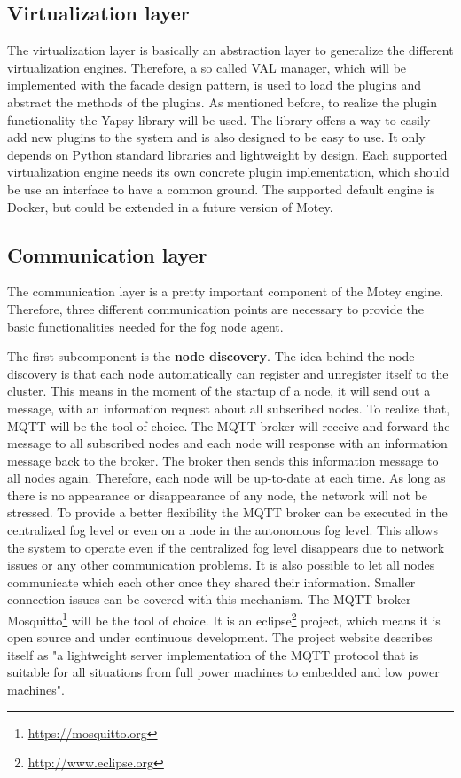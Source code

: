 \subsection{Virtualization layer}
The virtualization layer is basically an abstraction layer to generalize the different virtualization engines.
Therefore, a so called \ac{VAL} manager, which will be implemented with the facade design pattern, is used to load the plugins and abstract the methods of the plugins.
As mentioned before, to realize the plugin functionality the Yapsy library will be used.
The library offers a way to easily add new plugins to the system and is also designed to be easy to use.
It only depends on Python standard libraries and lightweight by design.
Each supported virtualization engine needs its own concrete plugin implementation, which should be use an interface to have a common ground.
The supported default engine is Docker, but could be extended in a future version of Motey.


\subsection{Communication layer}
\label{subsection:CommunicationLayer}
The communication layer is a pretty important component of the Motey engine.
Therefore, three different communication points are necessary to provide the basic functionalities needed for the fog node agent.

The first subcomponent is the \textbf{node discovery}.
The idea behind the node discovery is that each node automatically can register and unregister itself to the cluster.
This means in the moment of the startup of a node, it will send out a message, with an information request about all subscribed nodes.
To realize that, \ac{MQTT} will be the tool of choice.
The \ac{MQTT} broker will receive and forward the message to all subscribed nodes and each node will response with an information message back to the broker.
The broker then sends this information message to all nodes again.
Therefore, each node will be up-to-date at each time.
As long as there is no appearance or disappearance of any node, the network will not be stressed.
To provide a better flexibility the \ac{MQTT} broker can be executed in the centralized fog level or even on a node in the autonomous fog level.
This allows the system to operate even if the centralized fog level disappears due to network issues or any other communication problems.
It is also possible to let all nodes communicate which each other once they shared their information.
Smaller connection issues can be covered with this mechanism.
The \ac{MQTT} broker Mosquitto\footnote{\url{https://mosquitto.org}} will be the tool of choice.
It is an eclipse\footnote{\url{http://www.eclipse.org}} project, which means it is open source and under continuous development.
The project website describes itself as "a lightweight server implementation of the MQTT protocol that is suitable for all situations from full power machines to embedded and low power machines"\autocite{Eclipse:Mosquitto}.

